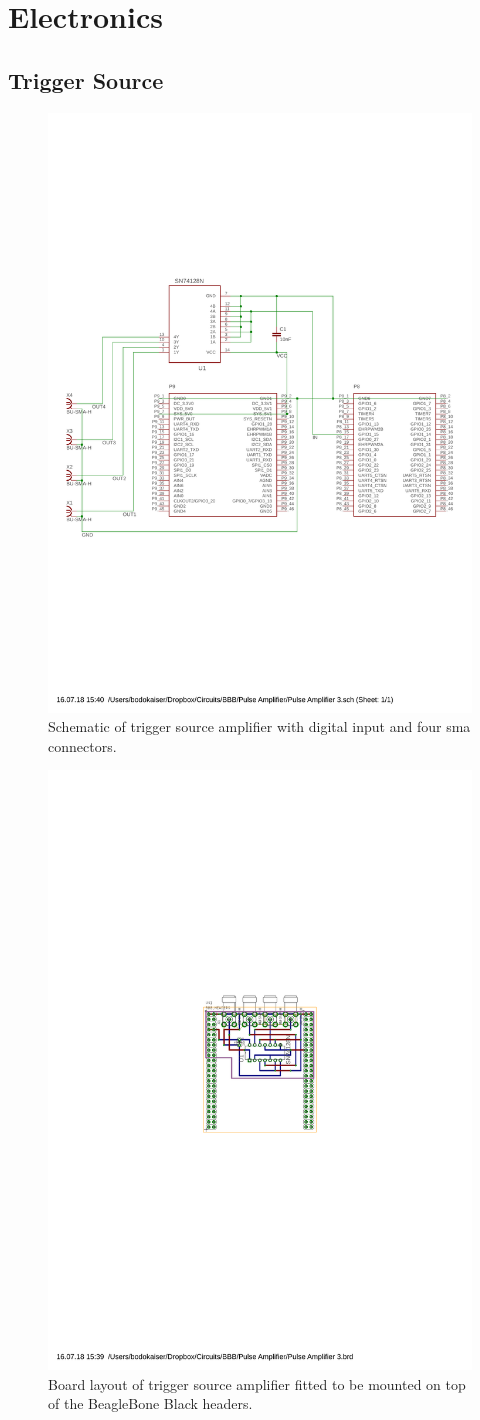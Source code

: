 \chapter{Electronics}

\section{Trigger Source}
\label{app:elec:trig}

\begin{figure}[h]
  \centering
  \includegraphics[width=\textwidth]{images/circuit/line-driver/scheme.pdf}
  \caption{Schematic of trigger source amplifier with digital input
  and four \gls{sma} connectors.}
  \label{fig:elec:trig:scheme}
\end{figure}

\begin{figure}[h]
  \centering
  \includegraphics[width=.4\textwidth]{images/circuit/line-driver/board.pdf}
  \caption{Board layout of trigger source amplifier fitted to be mounted on
  top of the BeagleBone Black headers.}
  \label{fig:elec:trig:board}
\end{figure}
